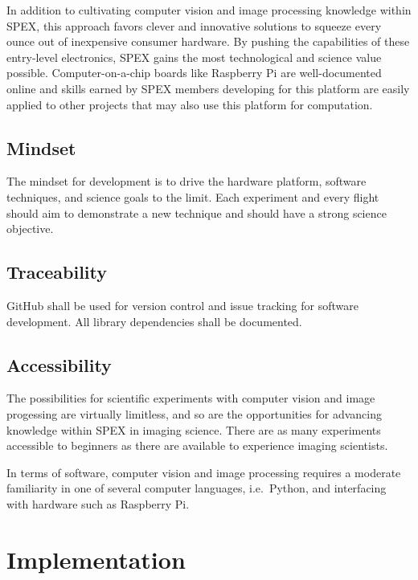 \documentclass[conference]{IEEEtran} %
\begin{document}
In addition to cultivating computer vision and image processing knowledge within SPEX, this approach favors clever and innovative solutions to squeeze every ounce out of inexpensive consumer hardware.
By pushing the capabilities of these entry-level electronics, SPEX gains the most technological and science value possible.
Computer-on-a-chip boards like Raspberry Pi are well-documented online and skills earned by SPEX members developing for this platform are easily applied to other projects that may also use this platform for computation.

\subsection{Mindset}
\label{subsec:mindset}

The mindset for development is to drive the hardware platform, software techniques, and science goals to the limit.
Each experiment and every flight should aim to demonstrate a new technique and should have a strong science objective.

\subsection{Traceability}
\label{subsec:traceability}

GitHub shall be used for version control and issue tracking for software development.
All library dependencies shall be documented.

\subsection{Accessibility}
\label{subsec:accessibility}

The possibilities for scientific experiments with computer vision and image progessing are virtually limitless, and so are the opportunities for advancing knowledge within SPEX in imaging science.
There are as many experiments accessible to beginners as there are available to experience imaging scientists.

In terms of software, computer vision and image processing requires a moderate familiarity in one of several computer languages, i.e.~Python, and interfacing with hardware such as Raspberry Pi.

\section{Implementation}
\label{sec:implementation}
\end{document}
